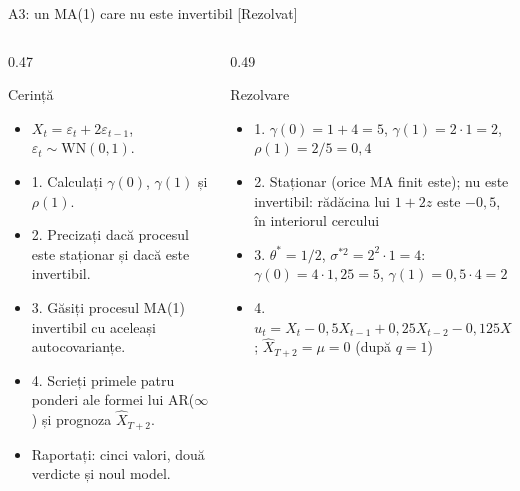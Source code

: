 \begin{frame}{A3: un MA(1) care nu este invertibil [Rezolvat]}
\itemsize{\scriptsize}
\begin{columns}[T]
\begin{column}{0.47\textwidth}
\begin{block}{Cerință}
\begin{itemize}
    \item $X_t = \varepsilon_t + 2\varepsilon_{t-1}$, $\varepsilon_t \sim \mathrm{WN}(0, 1)$.
    \item 1. Calculați $\gamma(0)$, $\gamma(1)$ și $\rho(1)$.
    \item 2. Precizați dacă procesul este staționar și dacă este invertibil.
    \item 3. Găsiți procesul MA(1) invertibil cu aceleași autocovarianțe.
    \item 4. Scrieți primele patru ponderi ale formei lui AR($\infty$) și prognoza $\hat X_{T+2}$.
    \item Raportați: cinci valori, două verdicte și noul model.
\end{itemize}
\end{block}
\end{column}
\begin{column}{0.49\textwidth}
\begin{exampleblock}{Rezolvare}
\begin{itemize}
    \item 1. $\gamma(0) = 1 + 4 = 5$, $\gamma(1) = 2 \cdot 1 = 2$, $\rho(1) = 2/5 = 0{,}4$
    \item 2. Staționar (orice MA finit este); nu este invertibil: rădăcina lui $1 + 2z$ este $-0{,}5$, în interiorul cercului
    \item 3. $\theta^* = 1/2$, $\sigma^{*2} = 2^2 \cdot 1 = 4$: $\gamma(0) = 4 \cdot 1{,}25 = 5$, $\gamma(1) = 0{,}5 \cdot 4 = 2$
    \item 4. $u_t = X_t - 0{,}5X_{t-1} + 0{,}25X_{t-2} - 0{,}125X_{t-3} + \dots$; $\hat X_{T+2} = \mu = 0$ (după $q = 1$)
\end{itemize}
\end{exampleblock}
\end{column}
\end{columns}
\end{frame}

